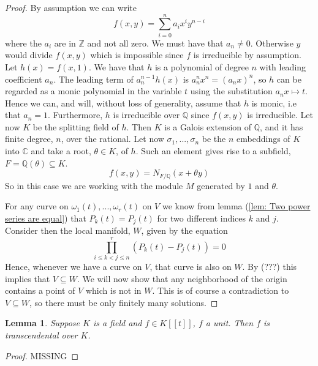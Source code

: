 \documentclass{article}
\newtheorem{lemma}{Lemma}[section]
\newcommand{\mbb}[1]{\mathbb{#1}}
\begin{document}
\begin{proof}
    By assumption we can write 
    $$f(x,y) = \sum_{i = 0}^n a_i x^{i} y^{n-i}$$
    where the $a_i$ are in $\mbb Z$ and not all zero. We must have that $a_n \neq 0$. Otherwise $y$ would divide $f(x,y)$ which is impossible since $f$ is irreducible by assumption. Let $h(x) = f(x,1)$. We have that $h$ is a polynomial of degree $n$ with leading coefficient $a_n$. The leading term of $a_n^{n-1} h(x)$ is $a_n^nx^n = (a_n x)^n$, so $h$ can be regarded as a monic polynomial in the variable $t$ using the substitution $a_n x \mapsto t$. Hence we can, and will, without loss of generality, assume that $h$ is monic, i.e that $a_n = 1$. Furthermore, $h$ is irreducible over $\mbb Q$ since $f(x,y)$ is irreducible. Let now $K$ be the splitting field of $h$. Then $K$ is a Galois extension of $\mbb Q$, and it has finite degree, $n$, over the rational. Let now $\sigma_1, ..., \sigma_n$ be the $n$ embeddings of $K$ into $\mbb C$ and take a root, $\theta \in K$, of $h$. Such an element gives rise to a subfield, $F = \mbb Q(\theta) \subseteq K$.
    $$f(x,y) = N_{F/\mbb{Q}}(x + \theta y)$$
    So in this case we are working with the module $M$ generated by $1$ and $\theta$. 



    For any curve on $\omega_1(t), ..., \omega_r(t)$ on $V$ we know from lemma (\ref{lem: Two power series are equal}) that $P_k(t) = P_j(t)$ for two different indices $k$ and $j$. Consider then the local manifold, $W$, given by the equation
    $$\prod_{i \leq k < j \leq n}^r (P_k(t) - P_j(t)) = 0$$
    Hence, whenever we have a curve on $V$, that curve is also on $W$. By (???) this implies that $V \subseteq W$. We will now show that any neighborhood of the origin contains a point of $V$ which is not in $W$. This is of course a contradiction to $V \subseteq W$, so there must be only finitely many solutions. 
    
    
\end{proof}

\begin{lemma}\label{lem: Unit power series is transcendental}
    Suppose $K$ is a field and $f \in K[[t]]$, $f$ a unit. Then $f$ is transcendental over $K$. 
\end{lemma}
\begin{proof}
MISSING
\end{proof}
\end{document}
